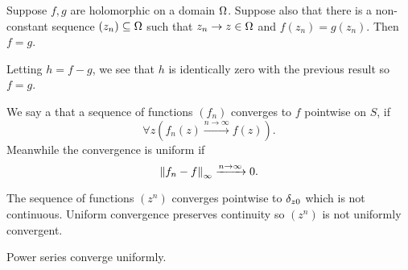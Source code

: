 \documentclass[12pt]{memoir}
\begin{document}
\begin{Th}
    Suppose $f,g$ are holomorphic on a domain $\Omega$. Suppose also that there is a non-constant sequence $(z_n)\subseteq\Omega$ such that $z_n\to z\in\Omega$ and $f(z_n)=g(z_n)$. Then $f=g$.
\end{Th}

\begin{ptcbp}
    Letting $h=f-g$, we see that $h$ is identically zero with the previous result so $f=g$.
\end{ptcbp}

\begin{Def}
    We say a that a sequence of functions $(f_n)$ converges to $f$ pointwise on $S$, if 
    $$\forall z(f_n(z)\xrightarrow[]{n\to\infty} f(z)).$$
    Meanwhile the convergence is uniform if 
    $$\norm{f_n-f}_\infty\xrightarrow[]{n\to\infty}0.$$
\end{Def}

\begin{Ex}
    The sequence of functions $(z^n)$ converges pointwise to $\delta_{z0}$ which is not continuous. Uniform convergence preserves continuity so $(z^n)$ is not uniformly convergent.\par
    Power series converge uniformly.
\end{Ex}
\ifx\nextra\undefined
\printindex
\else\fi
\nocite{*}


\end{document}
